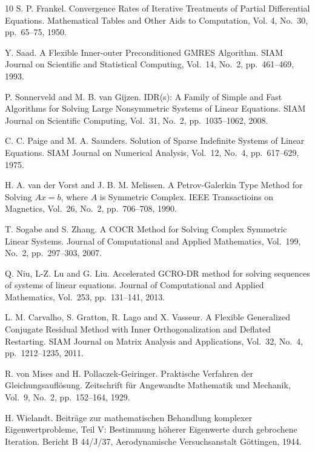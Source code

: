 \documentclass[a4paper]{jarticle}
\begin{document}
{{\begin{thebibliography}{10}
S. P. Frankel.
\newblock Convergence Rates of Iterative Treatments of Partial
	Differential Equations.
\newblock Mathematical Tables and Other Aids to Computation, Vol. 4, No.~30, 
	pp.\ 65--75, 1950.

Y. Saad.
\newblock A Flexible Inner-outer Preconditioned GMRES Algorithm.
\newblock SIAM Journal on Scientific and Statistical Computing, Vol.~14, No.~2, pp.\ 461--469, 1993.

P. Sonnerveld and M. B. van Gijzen.
\newblock IDR(s): A Family of Simple and Fast Algorithms for Solving Large Nonsymmetric Systems of Linear Equations.
\newblock SIAM Journal on Scientific Computing, Vol.~31, No.~2, pp.\ 1035--1062, 2008.

C. C. Paige and M. A. Saunders.
\newblock Solution of Sparse Indefinite Systems of Linear Equations.
\newblock SIAM Journal on Numerical Analysis, Vol.~12, No.~4, pp.\ 617--629, 1975.

H. A. van der Vorst and J. B. M. Melissen.
\newblock A Petrov-Galerkin Type Method for Solving $Ax=b$, where $A$ is Symmetric Complex.
\newblock IEEE Transactioins on Magnetics, Vol.~26, No.~2, pp.\ 706--708, 1990.

T. Sogabe and S. Zhang.
\newblock A COCR Method for Solving Complex Symmetric Linear Systems.
\newblock Journal of Computational and Applied Mathematics, Vol.~199, No.~2, pp.\ 297--303, 2007.

Q. Niu, L-Z. Lu and G. Liu.
\newblock Accelerated GCRO-DR method for solving sequences of systems of linear equations.
\newblock Journal of Computational and Applied Mathematics, Vol.~253, pp.\ 131--141, 2013. 

L. M. Carvalho, S. Gratton, R. Lago and X. Vasseur.
\newblock A Flexible Generalized Conjugate Residual Method with Inner Orthogonalization and Deflated Restarting.
\newblock SIAM Journal on Matrix Analysis and Applications, Vol.~32, No.~4, pp.\ 1212--1235, 2011. 

R. von Mises and H. Pollaczek-Geiringer.
\newblock Praktische Verfahren der Gleichungsaufl\"osung.
\newblock Zeitschrift f\"ur Angewandte Mathematik und Mechanik, Vol.~9, No.~2, pp.\ 152--164, 1929.

H. Wielandt.
\newblock Beitr\"age zur mathematischen Behandlung komplexer
	Eigenwertprobleme, Teil V: Bestimmung h\"oherer Eigenwerte durch
	gebrochene Iteration.
\newblock Bericht B 44/J/37, Aerodynamische Versuchsanstalt G\"ottingen, 1944.


\end{thebibliography}}}
\end{document}
